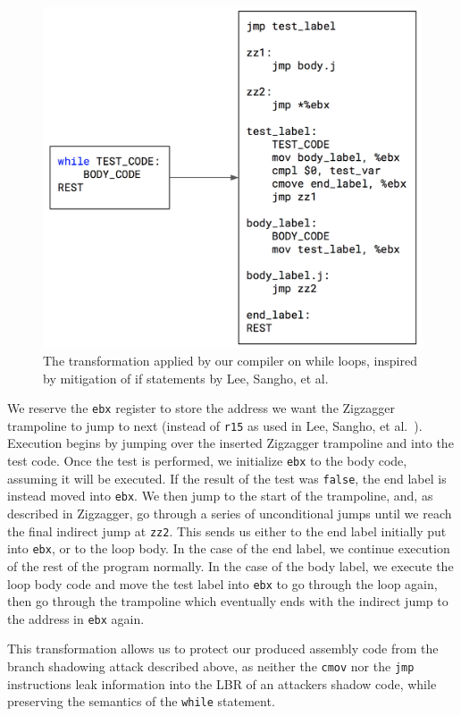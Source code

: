 \documentclass[sigplan, review]{acmart}
\begin{document}
\begin{figure}[bhp]
\includegraphics[width=\columnwidth]{./while_zigzagger.png}
\caption{The transformation applied by our compiler on while loops, inspired by mitigation of if statements by Lee, Sangho, et al.}
\label{fig:while_zigzagger}
\end{figure}

We reserve the \texttt{ebx} register to store the address we want the Zigzagger trampoline to jump to next (instead of \texttt{r15} as used in Lee, Sangho, et al.~\cite{lee2016inferring}). Execution begins by jumping over the inserted Zigzagger trampoline and into the test code. Once the test is performed, we initialize \texttt{ebx} to the body code, assuming it will be executed. If the result of the test was \texttt{false}, the end label is instead moved into \texttt{ebx}. We then jump to the start of the trampoline, and, as described in Zigzagger, go through a series of unconditional jumps until we reach the final indirect jump at \texttt{zz2}. This sends us either to the end label initially put into \texttt{ebx}, or to the loop body. In the case of the end label, we continue execution of the rest of the program normally. In the case of the body label, we execute the loop body code and move the test label into \texttt{ebx} to go through the loop again, then go through the trampoline which eventually ends with the indirect jump to the address in \texttt{ebx} again.

This transformation allows us to protect our produced assembly code from the branch shadowing attack described above, as neither the \texttt{cmov} nor the \texttt{jmp} instructions leak information into the LBR of an attackers shadow code, while preserving the semantics of the \texttt{while} statement.
\end{document}
